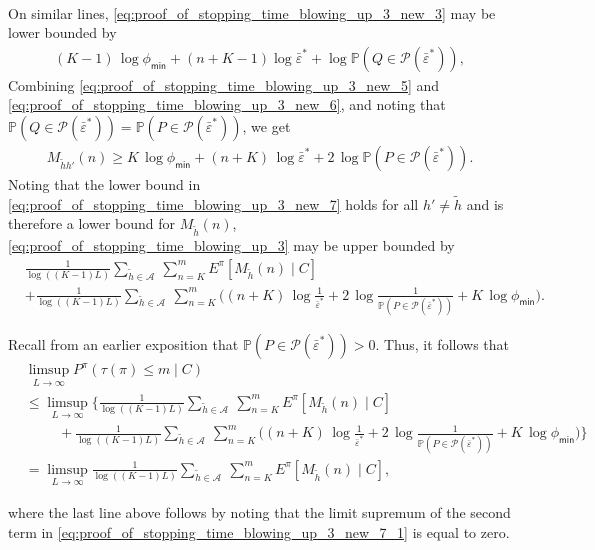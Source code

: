 {\begin{align}
\end{align} 
On similar lines, \eqref{eq:proof_of_stopping_time_blowing_up_3_new_3} may be lower bounded by
\begin{align}
	(K-1)\,\log \phi_{\textsf{min}}+(n+K-1)\log \bar{\varepsilon}^*+\log \mathbb{P}(Q\in \mathscr{P}(\bar{\varepsilon}^*)),
	\label{eq:proof_of_stopping_time_blowing_up_3_new_6}
\end{align}
Combining \eqref{eq:proof_of_stopping_time_blowing_up_3_new_5} and \eqref{eq:proof_of_stopping_time_blowing_up_3_new_6}, and noting that $\mathbb{P}(Q\in \mathscr{P}(\bar{\varepsilon}^*))=\mathbb{P}(P\in \mathscr{P}(\bar{\varepsilon}^*))$, we get
\begin{align}
	M_{\tilde{h}h'}(n)\geq K\,\log\phi_{\textsf{min}}+(n+K)\,\log \bar{\varepsilon}^* + 2\,\log \mathbb{P}(P\in \mathscr{P}(\bar{\varepsilon}^*)). 
	\label{eq:proof_of_stopping_time_blowing_up_3_new_7}
\end{align}
Noting that the lower bound in \eqref{eq:proof_of_stopping_time_blowing_up_3_new_7} holds for all $h'\neq \tilde{h}$ and is therefore a lower bound for $M_{\tilde{h}}(n)$,   \eqref{eq:proof_of_stopping_time_blowing_up_3} may be upper bounded by
\begin{align}
	&\frac{1}{\log ((K-1)L)}\sum\limits_{\tilde{h}\in \mathcal{A}}~\sum\limits_{n=K}^{m} E^\pi[M_{\tilde{h}}(n)\mid C] \nonumber\\
	&+ \frac{1}{\log ((K-1)L)}\sum\limits_{\tilde{h}\in \mathcal{A}}~\sum\limits_{n=K}^{m} \bigg((n+K)\,\log\frac{1}{\bar{\varepsilon}^*}+2\,\log \frac{1}{\mathbb{P}(P\in\mathscr{P}(\bar{\varepsilon}^*))}+K\,\log\phi_{\textsf{min}}\bigg).
	\label{eq:proof_of_stopping_time_blowing_up_3_new_7_1}
\end{align}
 
Recall from an earlier exposition that $\mathbb{P}(P\in \mathscr{P}(\bar{\varepsilon}^*))>0$. Thus, it follows that
\begin{align}
	&\limsup\limits_{L\to\infty} P^\pi(\tau(\pi) \leq m \mid C)\nonumber\\
	&\leq \limsup\limits_{L\to\infty} \bigg\lbrace\frac{1}{\log ((K-1)L)}\sum\limits_{\tilde{h}\in \mathcal{A}}~\sum\limits_{n=K}^{m} E^\pi[M_{\tilde{h}}(n)\mid C] \nonumber\\
	&\hspace{1cm}+ \frac{1}{\log ((K-1)L)}\sum\limits_{\tilde{h}\in \mathcal{A}}~\sum\limits_{n=K}^{m} \bigg((n+K)\,\log\frac{1}{\bar{\varepsilon}^*}+2\,\log \frac{1}{\mathbb{P}(P\in\mathscr{P}(\bar{\varepsilon}^*))}+K\,\log \phi_{\textsf{min}}\bigg)\bigg\rbrace\nonumber\\
	&=\limsup\limits_{L\to\infty} \frac{1}{\log ((K-1)L)}\sum\limits_{\tilde{h}\in \mathcal{A}}~\sum\limits_{n=K}^{m} E^\pi[M_{\tilde{h}}(n)\mid C],
	\label{eq:proof_of_stopping_time_blowing_up_3_new_8}
\end{align}} 
where the last line above follows by noting that the limit supremum of the second term in \eqref{eq:proof_of_stopping_time_blowing_up_3_new_7_1} is equal to zero.


